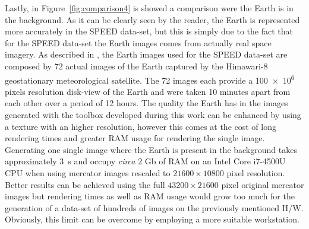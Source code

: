 Lastly, in Figure~\ref{fig:comparison4} is showed a comparison were the Earth is in the background. As it can be clearly seen by the reader, the Earth is represented more accurately in the SPEED data-set, but this is simply due to the fact that for the SPEED data-set the Earth images comes from actually real space imagery. As described in \cite{Sharma2019}, the Earth images used for the SPEED data-set are composed by 72 actual images of the Earth captured by the Himawari-8 geostationary meteorological satellite. The 72 images each provide a \num{100e6} pixels resolution disk-view of the Earth and were taken 10 minutes apart from each other over a period of 12 hours. The quality the Earth has in the images generated with the toolbox developed during this work can be enhanced by using a texture with an higher resolution, however this comes at the cost of long rendering times and greater RAM usage for rendering the single image. Generating one single image where the Earth is present in the background takes approximately \SI{3}{\s} and occupy \textit{circa} $2$ Gb of RAM on an Intel Core i7-4500U CPU when using mercator images rescaled to $21600 \times 10800$ pixel resolution. Better results can be achieved using the full $43200 \times 21600$ pixel original mercator images but rendering times as well as RAM usage would grow too much for the generation of a data-set of hundreds of images on the previously mentioned H/W. Obviously, this limit can be overcome by employing a more suitable workstation.

